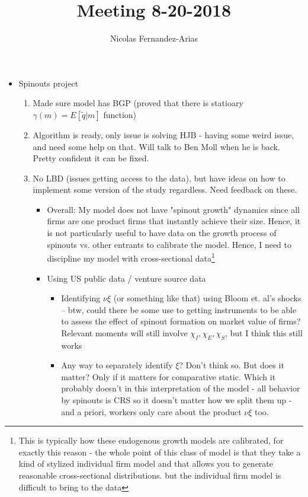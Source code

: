 \documentclass[12pt,english]{article}
\theoremstyle{remark}
\begin{document}
\title{Meeting 8-20-2018}
\author{Nicolas Fernandez-Arias}
\maketitle

\begin{itemize}
	\item Spinouts project
	\begin{enumerate}
		\item Made sure model has BGP (proved that there is statioary $\gamma(m) = E[\tilde{q}|m]$ function)
		\item Algorithm is ready, only issue is solving HJB - having some weird issue, and need some help on that. Will talk to Ben Moll when he is back. Pretty confident it can be fixed.
		\item No LBD (issues getting access to the data), but have ideas on how to implement some version of the study regardless. Need feedback on these. 
		\begin{itemize}
			\item Overall: My model does not have "spinout growth" dynamics since all firms are one product firms that instantly achieve their size. Hence, it is not particularly useful to have data on the growth process of spinouts vs. other entrants to calibrate the model. Hence, I need to discipline my model with cross-sectional data\footnote{This is typically how these endogenous growth models are calibrated, for exactly this reason - the whole point of this class of model is that they take a kind of stylized individual firm model and that allows you to generate reasonable cross-sectional distributions. but the individual firm model is difficult to bring to the data}
			\item Using US public data / venture source data
			\begin{itemize}
				\item Identifying $\nu \xi$ (or something like that) using Bloom et. al's shocks -- btw, could there be some use to getting instruments to be able to assess the effect of spinout formation on market value of firms? Relevant moments will still involve $\chi_I,\chi_E,\chi_S$, but I think this still works
				\item Any way to separately identify $\xi$? Don't think so. But does it matter? Only if it matters for comparative static. Which it probably doesn't in this interpretation of the model - all behavior by spinouts is CRS so it doesn't matter how we split them up - and a priori, workers only care about the product $\nu \xi$ too. 

\end{itemize}
\end{itemize}
\end{enumerate}
\end{itemize}
\end{document}
